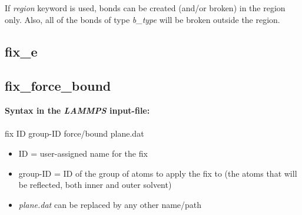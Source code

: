   If \emph{region} keyword is used, bonds can be created (and/or broken) in the region only. Also, all of the bonds of type \emph{b\_type} will be broken outside the region. 
  
\subsection{fix\_e}

% 

\subsection{fix\_force\_bound}
\label{sub:fix_force_bound}

\textbf{Syntax in the \textit{LAMMPS} input-file:}\\ \\
{ fix ID group-ID force/bound plane.dat}
\begin{itemize}
\item ID = user-assigned name for the fix
\item group-ID = ID of the group of atoms to apply the fix to (the atoms that will be reflected, both inner and outer solvent)
\item \textit{plane.dat} can be replaced by any other name/path
\end{itemize}

